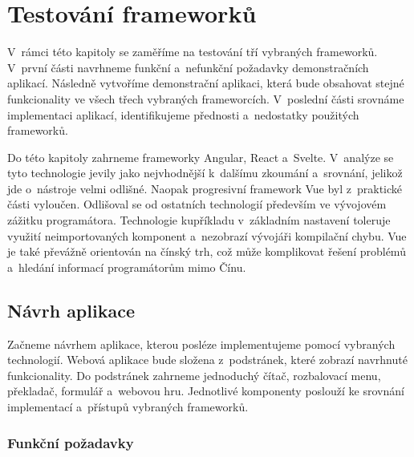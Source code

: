 \section{Testování frameworků}

V~rámci této kapitoly se zaměříme na testování tří vybraných frameworků. V~první části navrhneme funkční a~nefunkční požadavky demonstračních aplikací. 
Následně vytvoříme demonstrační aplikaci, která bude obsahovat stejné funkcionality ve všech třech vybraných frameworcích. 
V~poslední části srovnáme implementaci aplikací, identifikujeme přednosti a~nedostatky použitých frameworků.

Do této kapitoly zahrneme frameworky Angular, React a~Svelte. V~analýze se tyto technologie jevily jako nejvhodnější k~dalšímu zkoumání a~srovnání, jelikož jde o~nástroje velmi odlišné. 
Naopak progresivní framework Vue byl z~praktické části vyloučen. Odlišoval se od ostatních technologií především ve vývojovém zážitku programátora. 
Technologie kupříkladu v~základním nastavení toleruje využití neimportovaných komponent a~nezobrazí vývojáři kompilační chybu. 
Vue je také převážně orientován na čínský trh, což může komplikovat řešení problémů a~hledání informací programátorům mimo Čínu.

\subsection{Návrh aplikace}

Začneme návrhem aplikace, kterou posléze implementujeme pomocí vybraných technologií. 
Webová aplikace bude složena z~podstránek, které zobrazí navrhnuté funkcionality. 
Do podstránek zahrneme jednoduchý čítač, rozbalovací menu, překladač, formulář a~webovou hru. 
Jednotlivé komponenty poslouží ke srovnání implementací a~přístupů vybraných frameworků.

\subsubsection{Funkční požadavky}

